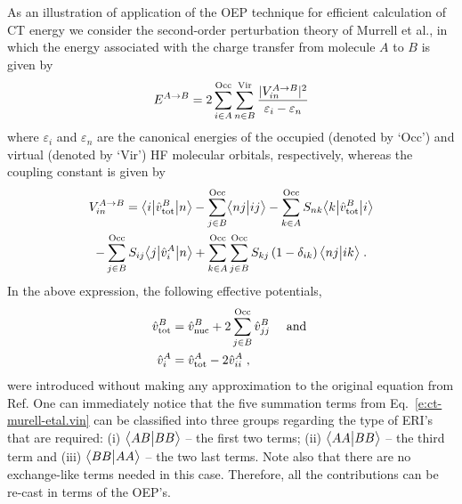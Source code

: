 As an illustration of application of the OEP technique for efficient calculation 
of CT energy we consider the second\hyp{}order perturbation theory of Murrell et al.,
in which the energy associated with the charge transfer from molecule $A$ to $B$ is given by
%
\begin{equation} \label{e:ct-murell-etal.e}
 E^{A\rightarrow B} = 2 \sum_{i\in A}^{\rm Occ} \sum_{n\in B}^{\rm Vir} 
  \frac{\vert V^{A\rightarrow B}_{in} \vert^2 }{\varepsilon_i - \varepsilon_n}
\end{equation}
%
%
where $\varepsilon_i$ and $\varepsilon_n$ are the canonical energies
of the occupied (denoted by `Occ') and virtual (denoted by `Vir') 
HF molecular orbitals, respectively,
whereas the coupling constant is given by
%
\begin{multline} \label{e:ct-murell-etal.vin}
 V^{A\rightarrow B}_{in} = 
        \bigl\langle {i} \bigl\lvert {\hat{v}^B_{\rm tot} } \bigl\lvert {n} \bigr\rangle 
      - \sum_{j\in B}^{\rm Occ} \bigl\langle {nj} \bigl\lvert {ij} \bigr\rangle 
      - \sum_{k\in A}^{\rm Occ} S_{nk} \bigl\langle {k} \bigl\lvert {\hat{v}^B_{\rm tot} } \bigl\lvert {i} \bigr\rangle \\
      - \sum_{j\in B}^{\rm Occ} S_{ij} \bigl\langle {j} \bigl\lvert {\hat{v}^A_{i} } \bigl\lvert {n} \bigr\rangle  
     + \sum_{k\in A}^{\rm Occ} \sum_{j\in B}^{\rm Occ}  
        S_{kj} \left( 1 - \delta_{ik} \right) 
        \bigl\langle {nj} \bigl\lvert {ik} \bigr\rangle \;.
\end{multline}
%
In the above expression, the following effective potentials,
%
\begin{subequations} 
\begin{align} \label{e:ct-murell-etal.vtot-vi}
 \hat{v}^B_{\rm tot} &= \hat{v}^B_{\rm nuc} + 2\sum_{j\in B}^{\rm Occ} \hat{v}^B_{jj} \quad\text{ and }\\ 
 \hat{v}^A_{i      } &= \hat{v}^A_{\rm tot} - 2\hat{v}^A_{ii} \;,
\end{align}
\end{subequations}
%
were introduced without making any approximation to the original equation
from Ref. One can immediately notice that the five summation terms
from Eq.~\eqref{e:ct-murell-etal.vin} can be classified into three groups
regarding the type of ERI's that are required:
(i) $\bigl\langle {AB} \bigl\lvert {BB} \bigr\rangle$ -- the first two terms;
(ii) $\bigl\langle {AA} \bigl\lvert {BB} \bigr\rangle$ -- the third term and
(iii) $\bigl\langle {BB} \bigl\lvert {AA} \bigr\rangle$ -- the two last terms. 
Note also that there are no exchange\hyp{}like terms needed in this case.
Therefore, all the contributions can be re\hyp{}cast in terms of the OEP's.

